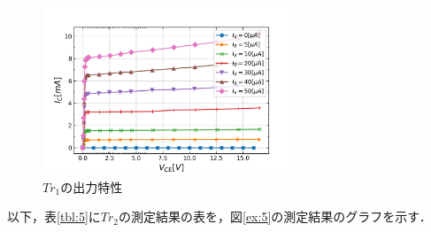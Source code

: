 \documentclass[10pt, a4j, dvipdfmx]{jarticle}
\begin{document}
    \begin{figure}[H]
        \centering
        \includegraphics[height=50mm]{ex-4.png}
        \caption{$Tr_1$の出力特性}
        \label{ex:4}
    \end{figure}

    \newpage
    以下，表\ref{tbl:5}に$Tr_2$の測定結果の表を，図\ref{ex:5}の測定結果のグラフを示す．
\end{document}
